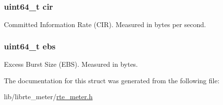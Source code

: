 \subsubsection[{cir}]{\setlength{\rightskip}{0pt plus 5cm}uint64\+\_\+t cir}\label{structrte__meter__srtcm__params_a882cbe4a787376c3a4d55bbf0b6e1f13}
Committed Information Rate (C\+I\+R). Measured in bytes per second. \hypertarget{structrte__meter__srtcm__params_aacbec96ca1e25912af9a0d5f72058f92}{}
\subsubsection[{ebs}]{\setlength{\rightskip}{0pt plus 5cm}uint64\+\_\+t ebs}\label{structrte__meter__srtcm__params_aacbec96ca1e25912af9a0d5f72058f92}
Excess Burst Size (E\+B\+S). Measured in bytes. 

The documentation for this struct was generated from the following file\+:\begin{DoxyCompactItemize}
\item 
lib/librte\+\_\+meter/\hyperlink{rte__meter_8h}{rte\+\_\+meter.\+h}\end{DoxyCompactItemize}
